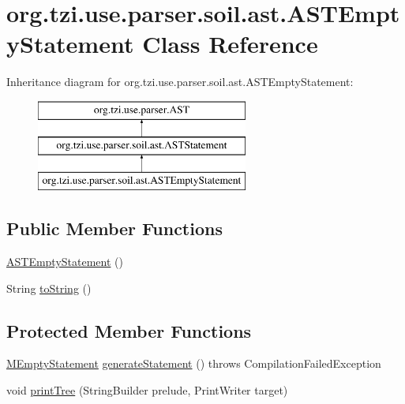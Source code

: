\hypertarget{classorg_1_1tzi_1_1use_1_1parser_1_1soil_1_1ast_1_1_a_s_t_empty_statement}{\section{org.\-tzi.\-use.\-parser.\-soil.\-ast.\-A\-S\-T\-Empty\-Statement Class Reference}
\label{classorg_1_1tzi_1_1use_1_1parser_1_1soil_1_1ast_1_1_a_s_t_empty_statement}
}
Inheritance diagram for org.\-tzi.\-use.\-parser.\-soil.\-ast.\-A\-S\-T\-Empty\-Statement\-:\begin{figure}[H]
\begin{center}
\leavevmode
\includegraphics[height=3.000000cm]{classorg_1_1tzi_1_1use_1_1parser_1_1soil_1_1ast_1_1_a_s_t_empty_statement}
\end{center}
\end{figure}
\subsection*{Public Member Functions}
\begin{DoxyCompactItemize}
\item 
\hyperlink{classorg_1_1tzi_1_1use_1_1parser_1_1soil_1_1ast_1_1_a_s_t_empty_statement_a7dcb61728610d06be53327fd94fe661a}{A\-S\-T\-Empty\-Statement} ()
\item 
String \hyperlink{classorg_1_1tzi_1_1use_1_1parser_1_1soil_1_1ast_1_1_a_s_t_empty_statement_a03a8e9b3942efc85c6c138299be28560}{to\-String} ()
\end{DoxyCompactItemize}
\subsection*{Protected Member Functions}
\begin{DoxyCompactItemize}
\item 
\hyperlink{classorg_1_1tzi_1_1use_1_1uml_1_1sys_1_1soil_1_1_m_empty_statement}{M\-Empty\-Statement} \hyperlink{classorg_1_1tzi_1_1use_1_1parser_1_1soil_1_1ast_1_1_a_s_t_empty_statement_ad981d4c11eb21ced84e3b1adecd65e9b}{generate\-Statement} ()  throws Compilation\-Failed\-Exception 
\item 
void \hyperlink{classorg_1_1tzi_1_1use_1_1parser_1_1soil_1_1ast_1_1_a_s_t_empty_statement_af979a591ac0b6e46692d468a3c1c4e00}{print\-Tree} (String\-Builder prelude, Print\-Writer target)
\end{DoxyCompactItemize}
